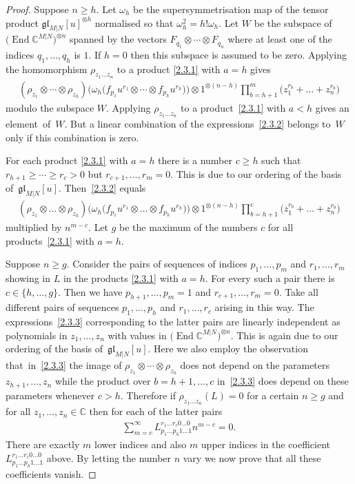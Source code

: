 \documentclass[10pt,a4paper]{amsart}
\numberwithin{equation}{section}
\def\CC{{\mathbb{C}}}
\def\CMN{\CC^{M|N}}
\def\End{\operatorname{End}}
\def\g{\glMN [u]}
\def\ge{\geqslant}
\def\glMN{\mathfrak{gl}_{M|N}}
\def\om{\omega}
\def\ot{\otimes}
\begin{document}
\begin{proof}
Suppose $n\ge h $.
Let $\om_{h}$ be the supersymmetrisation map of
the tensor product $\glMN[u]^{\ot h}$ normalised so that
$\om_{h}^{2}=h ! \om_{h} $.
Let $W$ be the subspace
of $\big(\End\CMN\big)^{\ot n}$ spanned by the vectors
$F_{q_{1}}\ot\cdots\ot F_{q_{n}}$
where at least one
of the indices $q_{1},\dots, q_{h}$ is $1 $.
If $h=0$ then this subspace is assumed to be zero.
Applying the homomorphism
$\rho_{z_1\dots z_n}$ to a product \eqref{2.3.1}
with $a=h$ gives
\begin{gather}\label{2.3.2}
( \rho_{z_1}\ot\cdots\ot\rho_{z_{h}} )
\big( \om_{h}
\big( f_{p_1}u^{r_1}
\ot\cdots\ot
f_{p_{h}}u^{r_h} \big) \big)
\ot1^{\ot (n-h)}
\prod_{b=h+1}^m
\big( z_1^{r_b}+\dots+z_n^{r_b} \big)
\end{gather}
modulo the subspace $W$. Applying
$\rho_{z_1\dots z_n}$ to a product~\eqref{2.3.1}
with $a<h$ gives an element~of~$W$.
But a linear combination of the
expressions~\eqref{2.3.2} belongs to~$W$
only if this combination is zero.

For each product \eqref{2.3.1} with $a=h$
there is a number $c\ge h$ such that $r_{h+1}\ge\cdots\ge r_c>0$
but $r_{c+1} ,\dots, r_m=0 $.
This is due to our ordering of the basis of~$\g $.
Then~\eqref{2.3.2} equals
\begin{gather}\label{2.3.3}
( \rho_{z_1}\ot\dots\ot\rho_{z_{h}} )
\big( \om_{h}
\big( f_{p_1}u^{r_1}
\ot\dots\ot
f_{p_{h}}u^{r_h} \big) \big)
\ot1^{\ot (n-h)}
\prod_{b=h+1}^c
\big( z_1^{r_b}+\dots+z_n^{r_b} \big)
\end{gather}
multiplied by $n^{m-c}$.
Let $g$ be the maximum of the numbers $c$
for all products~\eqref{2.3.1} with $a=h $.

Suppose $n\ge g$. Consider the pairs of sequences of indices
$p_1,\dots, p_{m}$ and $r_1,\dots, r_m$
showing in $L$ in the products \eqref{2.3.1}
with $a=h$. For every such a pair there is
$c\in\{h,\dots, g \}$.
Then we have
$p_{h+1},\dots, p_{m}=1$ and $r_{c+1},\dots, r_m=0$.
Take all different pairs of sequences $p_1,\dots, p_{h}$ and $r_1,\dots, r_c$
arising in this way.
The expressions~\eqref{2.3.3} corresponding to the latter pairs
are linearly independent as polynomials in $z_1,\dots, z_n$
with values in $\big(\End\CMN\big)^{\ot n}$.
This is again due to our ordering of the basis of~$\g$.
Here we also employ the observation that~in~\eqref{2.3.3} the image of
$\rho_{z_1}\ot\cdots\ot\rho_{z_{h}}$
does not depend on the parameters $z_{h+1},\dots, z_n$
while the product over $b=h+1,\dots, c$ in~\eqref{2.3.3}
does depend on these parameters whenever $c>h$.
Therefore if $\rho_{z_1\ldots z_n}(L)=0$ for a certain $n\ge g$
and for all $z_1,\dots, z_n\in\CC$ then for each of the latter pairs
\begin{gather*}
\sum_{m=c}^\infty
L_{p_1\ldots p_h 1\ldots 1}^{r_1\ldots r_c 0\ldots 0} n^{m-c}=0.
\end{gather*}
There are exactly $m$ lower indices and also $m$ upper indices
in the coefficient
$L_{p_1\ldots p_h 1\ldots 1}^{r_1\ldots r_c 0\ldots 0}$ above.
By letting the number $n$ vary we now prove that all these
coefficients vanish.
\end{proof}
\end{document}

